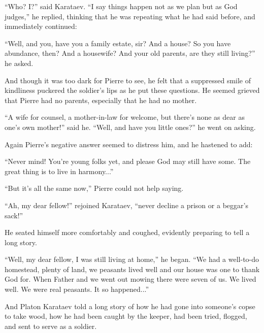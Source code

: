 ``Who? I?'' said Karataev. ``I say things happen not as we plan
but as God judges,'' he replied, thinking that he was repeating
what he had said before, and immediately continued:

``Well, and you, have you a family estate, sir? And a house? So
you have abundance, then? And a housewife? And your old parents,
are they still living?'' he asked.

And though it was too dark for Pierre to see, he felt that a
suppressed smile of kindliness puckered the soldier's lips as he
put these questions. He seemed grieved that Pierre had no
parents, especially that he had no mother.

``A wife for counsel, a mother-in-law for welcome, but there's
none as dear as one's own mother!'' said he. ``Well, and have you
little ones?'' he went on asking.

Again Pierre's negative answer seemed to distress him, and he
hastened to add:

``Never mind! You're young folks yet, and please God may still
have some.  The great thing is to live in harmony...''

``But it's all the same now,'' Pierre could not help saying.

``Ah, my dear fellow!'' rejoined Karataev, ``never decline a
prison or a beggar's sack!''

He seated himself more comfortably and coughed, evidently
preparing to tell a long story.

``Well, my dear fellow, I was still living at home,'' he
began. ``We had a well-to-do homestead, plenty of land, we
peasants lived well and our house was one to thank God for. When
Father and we went out mowing there were seven of us. We lived
well. We were real peasants. It so happened...''

And Platon Karataev told a long story of how he had gone into
someone's copse to take wood, how he had been caught by the
keeper, had been tried, flogged, and sent to serve as a soldier.

